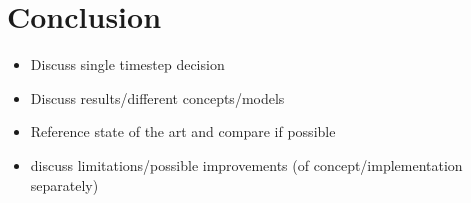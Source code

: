 \chapter{Conclusion\label{chap:conclusion}}


\begin{itemize}
\item Discuss single timestep decision
\item Discuss results/different concepts/models
\item Reference state of the art and compare if possible
\item discuss limitations/possible improvements (of concept/implementation separately)
\end{itemize}